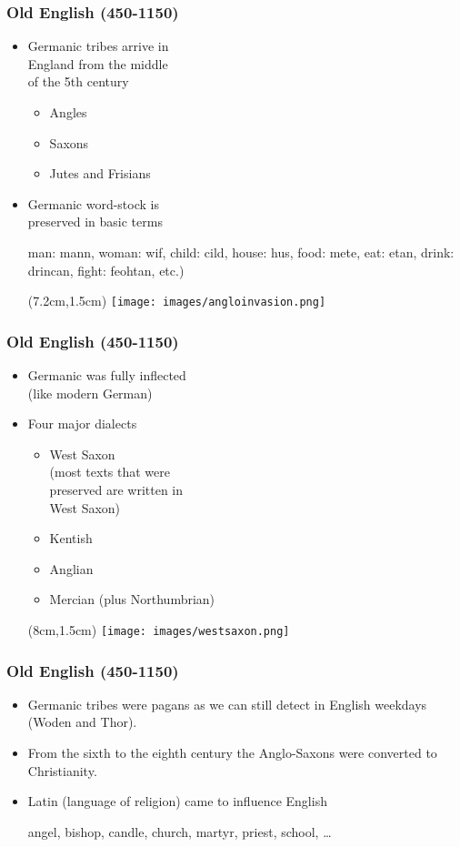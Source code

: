 \documentclass[12pt, table]{beamer}
\begin{document}
\begin{frame}
\frametitle{Old English (450-1150)}
\begin{itemize}
\item Germanic tribes arrive in \\ England from the middle \\ of  the 5th century
\begin{itemize}
\item Angles
\item Saxons
\item Jutes and Frisians
\end{itemize} 
\item Germanic word-stock is \\ preserved in basic terms 
\begin{exe}
\ex man: mann, woman: wif, child: cild, house: hus, food: mete, eat: etan, drink: drincan, fight: feohtan, etc.)
\end{exe}
\begin{textblock*}{10cm}(7.2cm,1.5cm)
\texttt{[image: images/angloinvasion.png]}
\end{textblock*}
\end{itemize}
\end{frame}

\begin{frame}
\frametitle{Old English (450-1150)}
\begin{itemize}
\item Germanic was fully inflected \\ (like modern German) 
\item Four major dialects
\begin{itemize}
\item West Saxon \\(most texts that were \\ preserved are written in \\ West Saxon)	
\item Kentish 
\item Anglian 
\item Mercian (plus Northumbrian)
\end{itemize}
\begin{textblock*}{10cm}(8cm,1.5cm)
\texttt{[image: images/westsaxon.png]}
\end{textblock*}
\end{itemize}
\end{frame}

\begin{frame}
\frametitle{Old English (450-1150)}
\begin{itemize}
\item Germanic tribes were pagans as we can still detect in English weekdays (Woden and Thor).
\item From the sixth to the eighth century the Anglo-Saxons were converted to Christianity.
\item Latin (language of religion) came to influence English 
\begin{exe}
\ex angel, bishop, candle, church, martyr, priest, school, \dots
\end{exe}
\end{itemize}
\end{frame}
\end{document}
